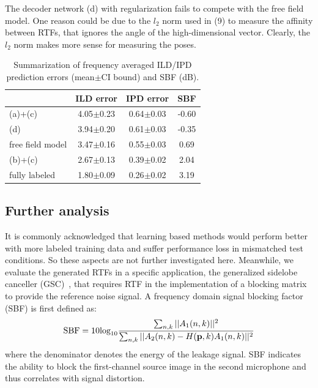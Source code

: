 \documentclass{article}
\begin{document}
The decoder network (d) with regularization fails to compete with the free field model. One reason could be due to the $l_2$ norm used in (9) to measure the affinity between RTFs, that ignores the angle of the high-dimensional vector. Clearly, the $l_2$ norm makes more sense for measuring the poses.

\begin{table}[tb]
\caption{Summarization of frequency averaged ILD/IPD prediction errors (mean$\pm$CI bound) and SBF (dB).}
\label{table:1}
\begin{center}
\begin{tabular}{|l|c|c||c|}
  \hline
                       & ILD error & IPD error & SBF \\ \hline
   (a)+(c)    & 4.05$\pm$0.23 & 0.64$\pm$0.03  &  -0.60\\ \hline
   (d)        & 3.94$\pm$0.20 & 0.61$\pm$0.03   &  -0.35\\ \hline
   free field model & 3.47$\pm$0.16 & 0.55$\pm$0.03 & 0.69\\ \hline
   (b)+(c)    & 2.67$\pm$0.13 & 0.39$\pm$0.02    &  2.04   \\ \hline
   fully labeled & 1.80$\pm$0.09 & 0.26$\pm$0.02 &  3.19 \\ \hline
\end{tabular}
\end{center}
\end{table}



\subsection{Further analysis}

It is commonly acknowledged that learning based methods would perform better with more labeled training data and suffer performance loss in mismatched test conditions. So these aspects are not further investigated here. Meanwhile, we evaluate the generated RTFs in a specific application, the generalized sidelobe canceller (GSC)~\cite{gannot2001signal}, that requires RTF in the implementation of a blocking matrix to provide the reference noise signal. A frequency domain signal blocking factor (SBF) is first defined as:
\begin{equation}\label{eq:sbf}
  \text{SBF}=10\text{log}_{10}\frac{\sum_{n,k} ||A_1(n,k)||^2}{\sum_{n,k} ||A_2(n,k)-H({\bf p},k)A_1(n,k)||^2}
\end{equation}
where the denominator denotes the energy of the leakage signal. SBF indicates the ability to block the first-channel source image in the second microphone and thus correlates with signal distortion.
\end{document}

